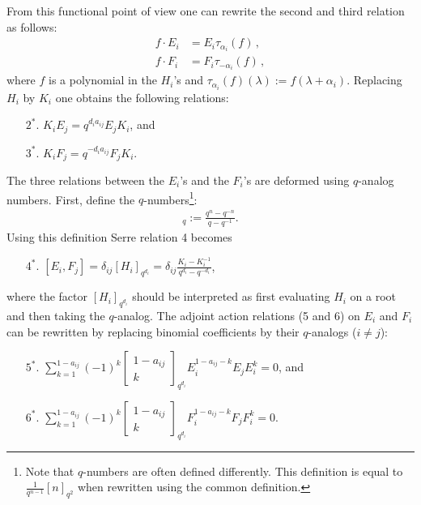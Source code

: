 \begin{construct}
        From this functional point of view one can rewrite the second and third relation as follows:
        \begin{align*}
            f\cdot E_i &= E_i\tau_{\alpha_i}(f)\,,\\
            f\cdot F_i &= F_i\tau_{-\alpha_i}(f)\,,
        \end{align*}
        where $f$ is a polynomial in the $H_i$'s and $\tau_{\alpha_i}(f)(\lambda) := f(\lambda+\alpha_i)$. Replacing $H_i$ by $K_i$ one obtains the following relations:
        \begin{enumerate}
            \item[$2^*.$] $K_iE_j = q^{d_ia_{ij}}E_jK_i$, and
            \item[$3^*.$] $K_iF_j = q^{-d_ia_{ij}}F_jK_i$.
        \end{enumerate}
        The three relations between the $E_i$'s and the $F_i$'s are deformed using $q$-analog numbers. First, define the $q$-numbers\footnote{Note that $q$-numbers are often defined differently. This definition is equal to $\frac{1}{q^{n-1}}[n]_{q^2}$ when rewritten using the common definition.}:
        \begin{gather}
            [n]_q := \frac{q^n - q^{-n}}{q - q^{-1}}.
        \end{gather}
        Using this definition Serre relation 4 becomes
        \begin{enumerate}
            \item[$4^*.$] $[E_i,F_j] = \delta_{ij}[H_i]_{q^{d_i}} = \delta_{ij}\frac{K_i - K_i^{-1}}{q^{d_i} - q^{-d_i}}$,
        \end{enumerate}
        where the factor $[H_i]_{q^{d_i}}$ should be interpreted as first evaluating $H_i$ on a root and then taking the $q$-analog. The adjoint action relations (5 and 6) on $E_i$ and $F_i$ can be rewritten by replacing binomial coefficients by their $q$-analogs ($i\neq j$):
        \begin{enumerate}
            \item[$5^*.$] $\sum_{k=1}^{1-a_{ij}} (-1)^k\begin{bmatrix}1-a_{ij}\\k\end{bmatrix}_{q^{d_i}}E_i^{1-a_{ij}-k}E_jE_i^k = 0$, and
            \item[$6^*.$] $\sum_{k=1}^{1-a_{ij}} (-1)^k\begin{bmatrix}1-a_{ij}\\k\end{bmatrix}_{q^{d_i}}F_i^{1-a_{ij}-k}F_jF_i^k = 0$.
        \end{enumerate}
    \end{construct}

